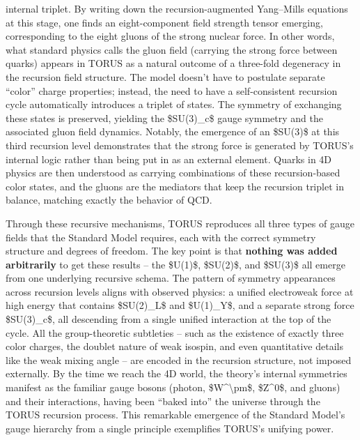 \documentclass[
]{article}
\begin{document}
\begin{itemize}
  internal triplet\hspace{0pt}. By writing down the recursion-augmented
  Yang--Mills equations at this stage, one finds an eight-component
  field strength tensor emerging, corresponding to the eight gluons of
  the strong nuclear force\hspace{0pt}. In other words, what standard
  physics calls the gluon field (carrying the strong force between
  quarks) appears in TORUS as a natural outcome of a three-fold
  degeneracy in the recursion field structure\hspace{0pt}. The model
  doesn't have to postulate separate ``color'' charge properties;
  instead, the need to have a self-consistent recursion cycle
  automatically introduces a triplet of states. The symmetry of
  exchanging these states is preserved, yielding the \$SU(3)\_c\$ gauge
  symmetry and the associated gluon field dynamics\hspace{0pt}. Notably,
  the emergence of an \$SU(3)\$ at this third recursion level
  demonstrates that the strong force is generated by TORUS's internal
  logic rather than being put in as an external element\hspace{0pt}.
  Quarks in 4D physics are then understood as carrying combinations of
  these recursion-based color states, and the gluons are the mediators
  that keep the recursion triplet in balance, matching exactly the
  behavior of QCD.
\end{itemize}

Through these recursive mechanisms, TORUS reproduces all three types of
gauge fields that the Standard Model requires, each with the correct
symmetry structure and degrees of freedom. The key point is that
\textbf{nothing was added arbitrarily} to get these results -- the
\$U(1)\$, \$SU(2)\$, and \$SU(3)\$ all emerge from one underlying
recursive schema. The pattern of symmetry appearances across recursion
levels aligns with observed physics: a unified electroweak force at high
energy that contains \$SU(2)\_L\$ and \$U(1)\_Y\$, and a separate strong
force \$SU(3)\_c\$, all descending from a single unified interaction at
the top of the cycle\hspace{0pt}. All the group-theoretic subtleties --
such as the existence of exactly three color charges, the doublet nature
of weak isospin, and even quantitative details like the weak mixing
angle -- are encoded in the recursion structure, not imposed
externally\hspace{0pt}. By the time we reach the 4D world, the theory's
internal symmetries manifest as the familiar gauge bosons (photon,
\$W\^{}\textbackslash pm\$, \$Z\^{}0\$, and gluons) and their
interactions, having been ``baked into'' the universe through the TORUS
recursion process. This remarkable emergence of the Standard Model's
gauge hierarchy from a single principle exemplifies TORUS's unifying
power.
\end{document}
